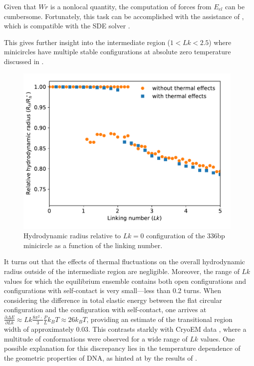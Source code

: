 \documentclass{doctoral}
\newcommand{\code}[1]{\texttt{\detokenize{#1}}}
\begin{document}
Given that $Wr$ is a nonlocal quantity, the computation of forces from $E_{el}$ can be cumbersome.
Fortunately, this task can be accomplished with the assistance of \code{jax.grad}, which is compatible with the SDE solver \code{pychastic}.

This gives further insight into the intermediate region ($1 < Lk < 2.5$) where minicircles have multiple stable configurations at absolute zero temperature discussed in \textcite{Waszkiewicz_2023_dna}.

\begin{figure}[htbp]
    \centering
    \includegraphics[height=0.5\linewidth]{figures/with_thermal_effects.pdf}
    \caption{Hydrodynamic radius relative to $Lk = 0$ configuration of the 336bp minicircle as a function of the linking number.}
    \label{fig:thermalized_loops}
\end{figure}

It turns out that the effects of thermal fluctuations on the overall hydrodynamic radius outside of the intermediate region are negligible.
Moreover, the range of $Lk$ values for which the equilibrium ensemble contains both open configurations and configurations with self-contact is very small—less than 0.2 turns.
When considering the difference in total elastic energy between the flat circular configuration and the configuration with self-contact, one arrives at $\frac{\partial \Delta E}{\partial Lk} \approx Lk \frac{8\pi^2 \cdot}{3} \frac{P}{L} k_B T \approx 26 k_B T$, providing an estimate of the transitional region width of approximately $0.03$.
This contrasts starkly with CryoEM data \cite{Irobalieva_2015}, where a multitude of conformations were observed for a wide range of $Lk$ values.
One possible explanation for this discrepancy lies in the temperature dependence of the geometric properties of DNA, as hinted at by the results of \textcite{Ranasinghe_2023}.
\end{document}
